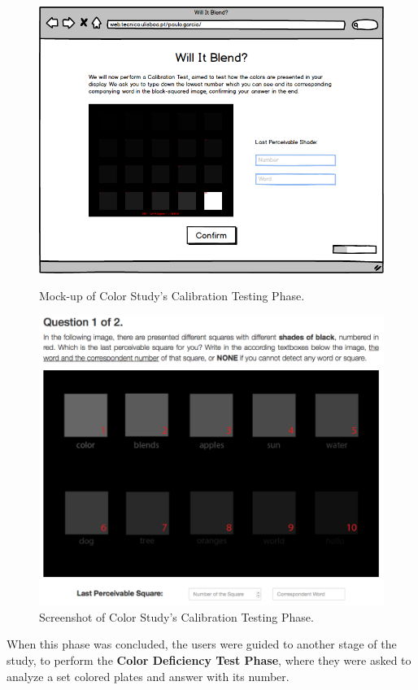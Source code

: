 \begin{figure}[htbp]
  \centering
  \begin{minipage}{0.49\textwidth}
		\centering
	  \includegraphics[width=\textwidth]{images/implementation/mockup_calibration.png}
	  \caption[Mock-up of Color Study's Calibration Testing Phase.]{Mock-up of Color Study's Calibration Testing Phase.}
	  \label{fig:mockup_calibration}
  \end{minipage} \hfill
	\begin{minipage}{0.49\textwidth}
		\centering
		\includegraphics[width=\textwidth]{images/implementation/screen_calibration.png}
		\caption[Screenshot of Color Study's Calibration Testing Phase.]{Screenshot of Color Study's Calibration Testing Phase.}
		\label{fig:screen_calibration}
	\end{minipage}
\end{figure}
%
When this phase was concluded, the users were guided to another stage of the study, to perform the \textbf{Color Deficiency Test Phase}, where
they were asked to analyze a set colored plates and answer with its number. \par
%
%
